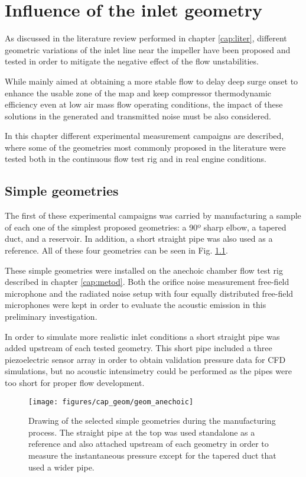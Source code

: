 \chapter{Influence of the inlet geometry} 
\label{cap:geom}

As discussed in the literature review performed in chapter \ref{cap:liter}, different geometric variations of the inlet line near the impeller have been proposed and tested in order to mitigate the negative effect of the flow unstabilities.

While mainly aimed at obtaining a more stable flow to delay deep surge onset to enhance the usable zone of the map and keep compressor thermodynamic efficiency even at low air mass flow operating conditions, the impact of these solutions in the generated and transmitted noise must be also considered.

In this chapter different experimental measurement campaigns are described, where some of the geometries most commonly proposed in the literature were tested both in the continuous flow test rig and in real engine conditions. 

\section{Simple geometries}
\label{sec:geom_simple}

The first of these experimental campaigns was carried by manufacturing a sample of each one of the simplest proposed geometries: a 90º sharp elbow, a tapered duct, and a reservoir. In addition, a short straight pipe was also used as a reference. All of these four geometries can be seen in Fig. \ref{fig:image_simple_geom}.

These simple geometries were installed on the anechoic chamber flow test rig described in chapter \ref{cap:metod}. Both the orifice noise measurement free-field microphone and the radiated noise setup with four equally distributed free-field microphones were kept in order to evaluate the acoustic emission in this preliminary investigation.

In order to simulate more realistic inlet conditions a short straight pipe was added upstream of each tested geometry. This short pipe included a three piezoelectric sensor array in order to obtain  validation pressure data for CFD simulations, but no acoustic intensimetry could be performed as the pipes were too short for proper flow development.

\begin{figure}[tb!]
\centering
\texttt{[image: figures/cap\_geom/geom\_anechoic]}
\caption{Drawing of the selected simple geometries during the manufacturing process. The straight pipe at the top was used standalone as a reference and also attached upstream of each geometry in order to measure the instantaneous pressure except for the tapered duct that used a wider pipe.}
\label{fig:image_simple_geom}
\end{figure}

